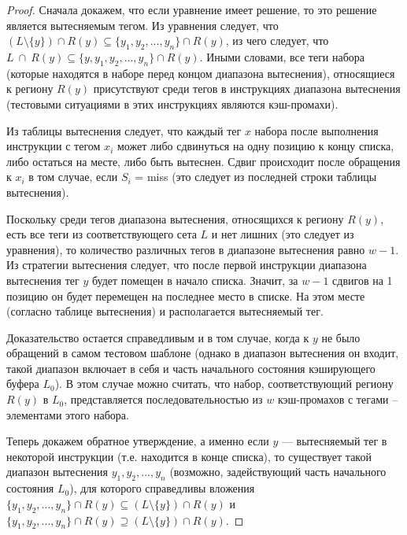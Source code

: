 \theoremtext{\ref{FIFO_equation}}{\DiapazonFIFO}
\begin{proof}
  Сначала докажем, что если уравнение имеет решение, то это решение
  является вытесняемым тегом. Из уравнения следует, что
  $(L\setminus\{y\}) \cap R(y) \subseteq \{y_1, y_2, ..., y_n\} \cap
  R(y)$, из чего следует, что $L~\cap~R(y) \subseteq \{y, y_1, y_2,
  ..., y_n\} \cap R(y)$. Иными словами, все теги набора (которые
  находятся в наборе перед концом диапазона вытеснения), относящиеся
  к региону $R(y)$ присутствуют среди тегов в инструкциях диапазона вытеснения
  (тестовыми ситуациями в этих инструкциях являются кэш-промахи).

  Из таблицы вытеснения следует, что каждый тег $x$ набора после
  выполнения инструкции с тегом $x_i$ может либо сдвинуться на одну позицию к
  концу списка, либо остаться на месте, либо быть вытеснен. Сдвиг
  происходит после обращения к $x_i$ в том случае, если $S_i$ = miss
  (это следует из последней строки таблицы вытеснения).

  Поскольку среди тегов диапазона вытеснения, относящихся к региону $R(y)$,
  есть все теги из соответствующего сета $L$ и
  нет лишних (это следует из уравнения), то количество различных
  тегов в диапазоне вытеснения равно $w-1$. Из
  стратегии вытеснения следует, что после первой инструкции
  диапазона вытеснения тег $y$ будет помещен в начало списка.
  Значит, за $w-1$ сдвигов на 1 позицию он будет перемещен на
  последнее место в списке. На этом месте (согласно таблице вытеснения)
  и располагается вытесняемый тег.

  Доказательство остается справедливым и в том случае, когда к $y$
  не было обращений в самом тестовом шаблоне (однако в диапазон
  вытеснения он входит, такой диапазон включает в себя и часть
  начального состояния кэширующего буфера $L_0$). В этом случае
  можно считать, что набор, соответствующий региону $R(y)$ в $L_0$,
  представляется последовательностью из $w$ кэш-промахов с тегами --
  элементами этого набора.

  Теперь докажем обратное утверждение, а именно если $y$ --- вытесняемый
  тег в некоторой инструкции (т.е. находится в конце списка), то
  существует такой диапазон вытеснения $y_1, y_2, ..., y_n$
  (возможно, задействующий часть начального состояния $L_0$), для
  которого справедливы вложения $\{y_1, y_2, ..., y_n\} \cap R(y) \subseteq
  (L\setminus\{y\}) \cap R(y)$ и $\{y_1, y_2, ..., y_n\} \cap R(y) \supseteq
  (L\setminus\{y\}) \cap R(y)$.


\end{proof}
